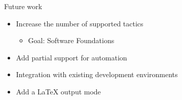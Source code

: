 \documentclass[pdf]{beamer}
\begin{document}
\begin{frame}{Future work}
    \begin{itemize}
        \item Increase the number of supported tactics
        \begin{itemize}
            \item Goal: Software Foundations
        \end{itemize}
        \item Add partial support for automation
        \item Integration with existing development environments
        \item Add a LaTeX output mode
    \end{itemize}
\end{frame}
\end{document}
